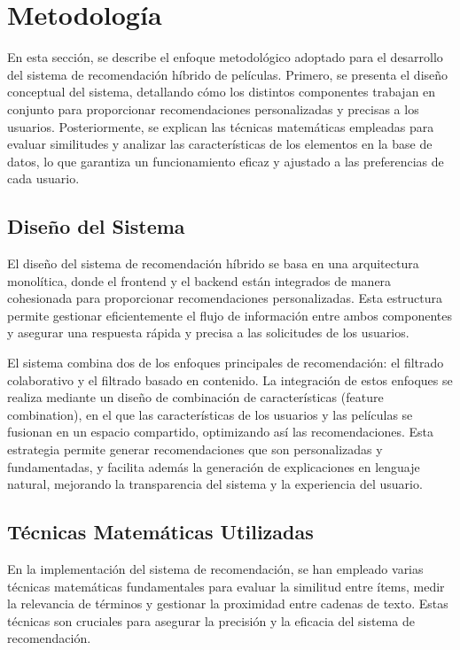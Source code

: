 \documentclass{llncs}
\begin{document}
	
	
	\section{Metodología}
	En esta sección, se describe el enfoque metodológico adoptado para el desarrollo del sistema de recomendación híbrido de películas. Primero, se presenta el diseño conceptual del sistema, detallando cómo los distintos componentes trabajan en conjunto para proporcionar recomendaciones personalizadas y precisas a los usuarios. Posteriormente, se explican las técnicas matemáticas empleadas para evaluar similitudes y analizar las características de los elementos en la base de datos, lo que garantiza un funcionamiento eficaz y ajustado a las preferencias de cada usuario. 
	\subsection{Diseño del Sistema}
	El diseño del sistema de recomendación híbrido se basa en una arquitectura monolítica, donde el frontend y el backend están integrados de manera cohesionada para proporcionar recomendaciones personalizadas. Esta estructura permite gestionar eficientemente el flujo de información entre ambos componentes y asegurar una respuesta rápida y precisa a las solicitudes de los usuarios.
	
	El sistema combina dos de los enfoques principales de recomendación: el filtrado colaborativo y el filtrado basado en contenido. La integración de estos enfoques se realiza mediante un diseño de combinación de características (feature combination), en el que las características de los usuarios y las películas se fusionan en un espacio compartido, optimizando así las recomendaciones. Esta estrategia permite generar recomendaciones que son personalizadas y fundamentadas, y facilita además la generación de explicaciones en lenguaje natural, mejorando la transparencia del sistema y la experiencia del usuario.
	
	\subsection{Técnicas Matemáticas Utilizadas}
	En la implementación del sistema de recomendación, se han empleado varias técnicas matemáticas fundamentales para evaluar la similitud entre ítems, medir la relevancia de términos y gestionar la proximidad entre cadenas de texto. Estas técnicas son cruciales para asegurar la precisión y la eficacia del sistema de recomendación.
	
\end{document}
